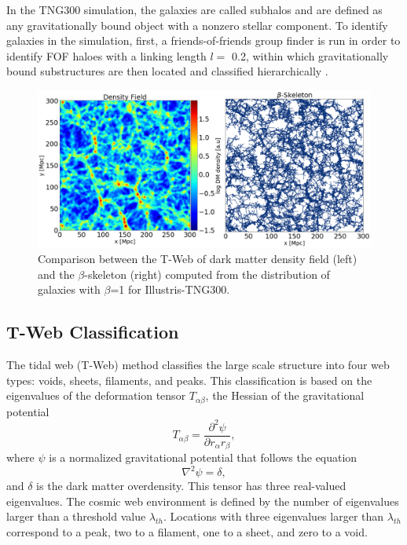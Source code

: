 \documentclass[usenatbib]{mnras}
\begin{document}
In the TNG300 simulation, the galaxies are called subhalos and
are defined as any gravitationally
bound object with a nonzero
stellar component.
To identify galaxies in the simulation,
first, a friends-of-friends group finder is run
in order to identify FOF haloes with
a linking length $l=$ 0.2,
within which gravitationally bound substructures
are then located and classified hierarchically \cite{Pillepich2018a}.
 
 
\begin{figure}
\centering
 \includegraphics[scale=0.28]{Figs/p_Fig1_.png}%
 \caption{Comparison between the T-Web of dark matter density field
   (left) and the $\beta$-skeleton (right) computed from the
   distribution of galaxies with $\beta$=1 for Illustris-TNG300.}  
 \label{fig:TWebBsk}
\end{figure}

\subsection{T-Web Classification}

The tidal web (T-Web) method \citep{Hahn2007, Forero-Romero2009}
classifies the large scale structure into four web types: voids,
sheets, filaments, and peaks.   
This classification is based on the eigenvalues of the deformation
tensor $T_{\alpha\beta}$, the Hessian of the gravitational potential 
\begin{equation}
T_{\alpha\beta}=\frac{\partial^2\psi}{\partial r_{\alpha}r_{\beta}},
\end{equation}
%
where $\psi$ is a normalized gravitational potential that follows the equation
\begin{equation}
    \nabla^2 \psi = \delta,
\end{equation}
%
and $\delta$ is the dark matter overdensity.
This tensor has three real-valued eigenvalues. 
The cosmic web environment is defined by the number of eigenvalues
larger than a threshold value $\lambda_{th}$.
Locations with three eigenvalues larger than $\lambda_{th}$ correspond
to a peak, two to a filament, one to a sheet, and zero to a void.
\end{document}
